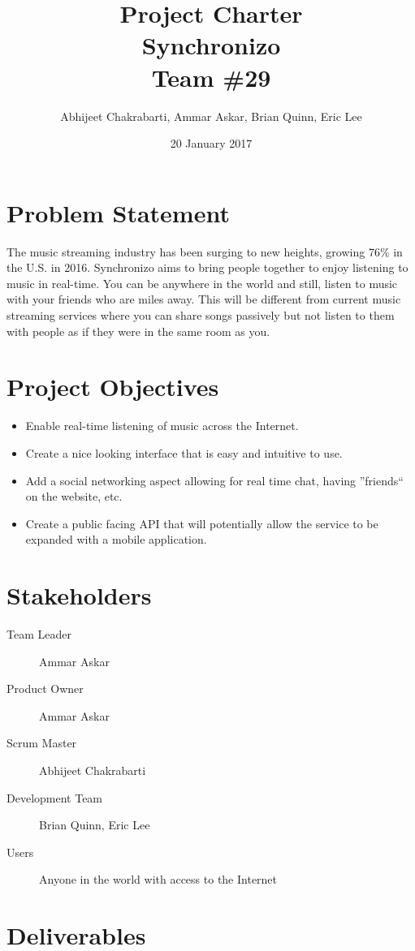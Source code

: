 \documentclass{article}
\title{\textbf{Project Charter}\\ 
Synchronizo \\
\large Team \#29}
\author{Abhijeet Chakrabarti, Ammar Askar, Brian Quinn, Eric Lee }
\date{20 January 2017}
\begin{document}
\maketitle

\section{Problem Statement}
The music streaming industry has been surging to new heights, growing 76\% in the U.S. in 2016. Synchronizo aims to bring people together to enjoy listening to music in real-time. You can be anywhere in the world and still, listen to music with your friends who are miles away. This will be different from current music streaming services where you can share songs passively but not listen to them with people as if they were in the same room as you.
\section{Project Objectives}

\begin{itemize}
    \item Enable real-time listening of music across the Internet.
    \item Create a nice looking interface that is easy and intuitive to use.
    \item Add a social networking aspect allowing for real time chat, having ''friends`` on the website, etc.
    \item Create a public facing API that will potentially allow the service to be expanded with a mobile application.
\end{itemize}

\section{Stakeholders}
\begin{description}
    \item[Team Leader] Ammar Askar
    \item[Product Owner] Ammar Askar
    \item[Scrum Master] Abhijeet Chakrabarti
    \item[Development Team] Brian Quinn, Eric Lee
    \item[Users] Anyone in the world with access to the Internet
\end{description}


\section{Deliverables}
\end{document}
